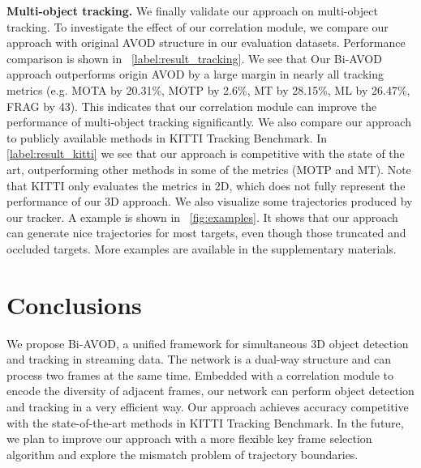 \documentclass{bmvc2k}
\begin{document}
\textbf{Multi-object tracking.} We finally validate our approach on multi-object tracking. To investigate the effect of our correlation module, we compare our approach with original AVOD structure in our evaluation datasets. Performance comparison is shown in  \tablename \, \ref{label:result_tracking}. We see that Our Bi-AVOD approach outperforms origin AVOD by a large margin in nearly all tracking metrics (e.g. MOTA by 20.31\%, MOTP by 2.6\%, MT by 28.15\%, ML by 26.47\%, FRAG by 43). This indicates that our correlation module can improve the performance of multi-object tracking significantly. We also compare our approach to publicly available methods in KITTI Tracking Benchmark. In \tablename \, \ref{label:result_kitti} we see that our approach is competitive with the state of the art, outperforming other methods in some of the metrics (MOTP and MT). Note that KITTI only evaluates the metrics in 2D, which does not fully represent the performance of our 3D approach.
We also visualize some trajectories produced by our tracker. A example is shown in \figurename \, \ref{fig:examples}. It shows that our approach can generate nice trajectories for most targets, even though those truncated and occluded targets. More examples are available in the supplementary materials. 

\section{Conclusions}
\label{sec:conclusions} We propose Bi-AVOD, a unified framework for simultaneous 3D object detection and tracking in streaming data. The network is a dual-way structure and can  process two frames at the same time. Embedded with a correlation module to encode the diversity of adjacent frames, our network can perform object detection and tracking in a very efficient way. Our approach achieves accuracy competitive with the state-of-the-art methods in KITTI Tracking Benchmark. In the future, we plan to improve our approach with a more flexible key frame selection algorithm and explore the mismatch problem of trajectory boundaries.
\end{document}
